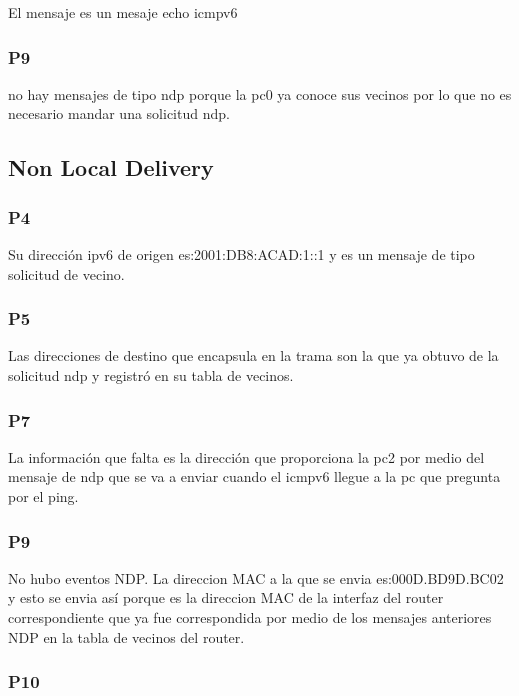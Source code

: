 \documentclass[]{article}
\begin{document}
	El mensaje es un mesaje echo icmpv6
	
	\subsubsection{\textbf{P9}}
	
	no hay mensajes de tipo ndp porque la pc0 ya conoce sus vecinos por lo que no es necesario mandar una solicitud ndp.
	
	
	\subsection{\textbf{Non Local Delivery}}
	
	\subsubsection{\textbf{P4}}
	
	Su dirección ipv6 de origen es:2001:DB8:ACAD:1::1 y es un mensaje de tipo solicitud de vecino.
	
	\subsubsection{\textbf{P5}}
	
	Las direcciones de destino que encapsula en la trama son la que ya obtuvo de la solicitud ndp y registró en su tabla de vecinos.
	
	\subsubsection{\textbf{P7}}
	
	La información que falta es la dirección que proporciona la pc2 por medio del mensaje de ndp que se va a enviar cuando el icmpv6 llegue a la pc que pregunta por el ping.
	
	\subsubsection{\textbf{P9}}
	
	No hubo eventos NDP. La direccion MAC a la que se envia es:000D.BD9D.BC02 y esto se envia así porque es la direccion MAC de la interfaz del router correspondiente que ya fue correspondida por medio de los mensajes anteriores NDP en la tabla de vecinos del router.
	
	\subsubsection{\textbf{P10}}
	
\end{document}
